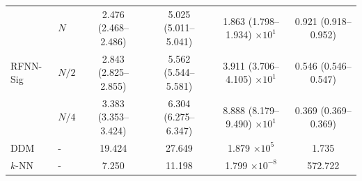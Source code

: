 \documentclass{article}
\begin{document}
\begin{table}[htbp]
{\begin{tabular}{@{}llcccc@{}}
\multirow{3}{*}{RFNN-Sig} 
&	$N$	    & 2.476 (2.468--2.486) & 5.025 (5.011--5.041) & 1.863 (1.798--1.934) $\times 10^1$ & 0.921 (0.918--0.952) \\
&	$N/2$	& 2.843 (2.825--2.855) & 5.562 (5.544--5.581) & 3.911 (3.706--4.105) $\times 10^1$ & 0.546 (0.546--0.547) \\
&	$N/4$	& 3.383 (3.353--3.424) & 6.304 (6.275--6.347) & 8.888 (8.179--9.490) $\times 10^1$ & 0.369 (0.369--0.369) \\
\midrule

DDM  &	-	& 19.424 & 27.649 & 1.879 $\times 10^{5}$  & 1.735   \\
$k$-NN &	-	& 7.250  & 11.198 & 1.799 $\times 10^{-8}$ & 572.722 \\

\bottomrule
\end{tabular}%
}
\end{table}
\end{document}
